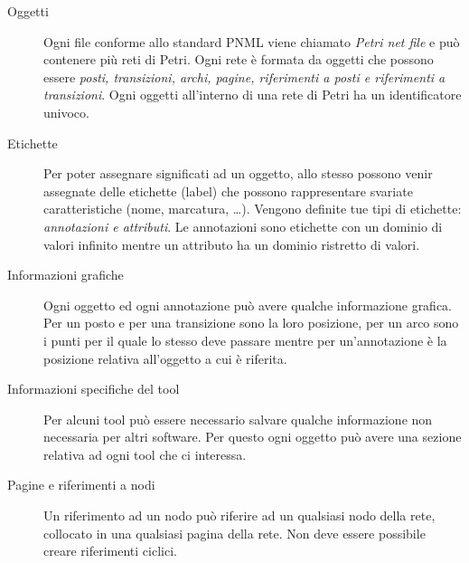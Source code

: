 \documentclass[italian,12pt]{book}
\begin{document}
\begin{description}
\item[Oggetti] Ogni file conforme allo standard PNML viene chiamato
  \emph{Petri net file} e può contenere più reti di Petri. Ogni rete
  è formata da oggetti che possono essere \emph{posti, transizioni,
    archi, pagine, riferimenti a posti e riferimenti a
    transizioni}. Ogni oggetti all'interno di una rete di Petri ha
  un identificatore univoco.
\item[Etichette] Per poter assegnare significati ad un oggetto,
  allo stesso possono venir assegnate delle etichette (label)
  che possono rappresentare svariate caratteristiche (nome,
  marcatura, \dots). Vengono definite tue tipi di etichette:
  \emph{annotazioni e attributi}. Le annotazioni sono etichette
  con un dominio di valori infinito mentre un attributo ha un
  dominio ristretto di valori.
\item[Informazioni grafiche] Ogni oggetto ed ogni annotazione
  può avere qualche informazione grafica. Per un posto e per una
  transizione sono la loro posizione, per un arco sono i punti
  per il quale lo stesso deve passare mentre per un'annotazione
  è la posizione relativa all'oggetto a cui è riferita.
\item[Informazioni specifiche del tool] Per alcuni tool può
  essere necessario salvare qualche informazione non necessaria
  per altri software. Per questo ogni oggetto può avere una
  sezione relativa ad ogni tool che ci interessa.
\item[Pagine e riferimenti a nodi] Un riferimento ad un nodo può
  riferire ad un qualsiasi nodo della rete, collocato in una
  qualsiasi pagina della rete. Non deve essere possibile creare
  riferimenti ciclici.        
\end{description} 
\end{document}
